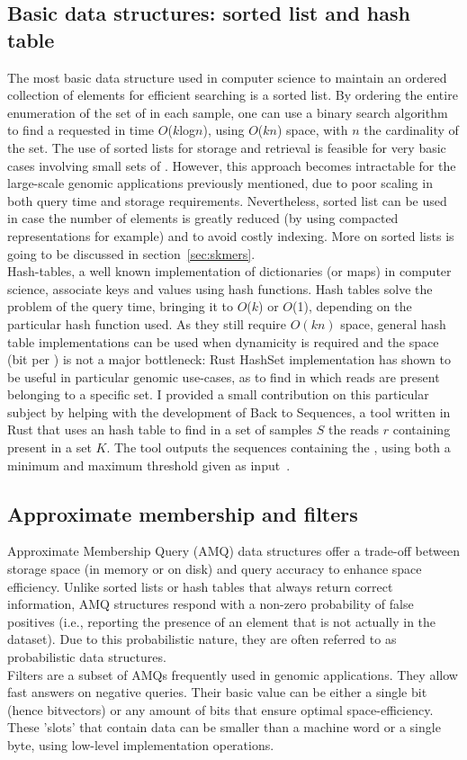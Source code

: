 \subsection{Basic data structures: sorted list and hash table}
The most basic data structure used in computer science to maintain an ordered collection of elements for efficient searching is a sorted list. By ordering the entire enumeration of the set of \kmers in each sample, one can use a binary search algorithm to find a requested \kmer in time $O$($k$log$n$), using $O$($kn$) space, with $n$ the cardinality of the set. The use of sorted lists for \kmer storage and retrieval is feasible for very basic cases involving small sets of \kmers. However, this approach becomes intractable for the large-scale genomic applications previously mentioned, due to poor scaling in both query time and storage requirements. Nevertheless, sorted list can be used in case the number of elements is greatly reduced (by using compacted \kmer representations for example) and to avoid costly indexing. More on sorted lists is going to be discussed in section~\ref{sec:skmers}.\\
Hash-tables, a well known implementation of dictionaries (or maps) in computer science, associate keys and values using hash functions. Hash tables solve the problem of the query time, bringing it to $O$($k$) or $O$(1), depending on the particular hash function used. As they still require $O(kn)$ space, general hash table implementations can be used when dynamicity is required and the space (bit per \kmer) is not a major bottleneck: Rust HashSet implementation has shown to be useful in particular genomic use-cases, as to find in which reads are present \kmers belonging to a specific set. I provided a small contribution on this particular subject by helping with the development of Back to Sequences, a tool written in Rust that uses an hash table to find in a set of samples $S$ the reads $r$ containing \kmers present in a set $K$. The tool outputs the sequences containing the \kmers, using both a minimum and maximum threshold given as input~\cite{back_to_sequences}.\\

\subsection{Approximate membership and filters}
Approximate Membership Query (\gls{AMQ}) data structures offer a trade-off between storage space (in memory or on disk) and query accuracy to enhance space efficiency. Unlike sorted lists or hash tables that always return correct information, AMQ structures respond with a non-zero probability of false positives (i.e., reporting the presence of an element that is not actually in the dataset). Due to this probabilistic nature, they are often referred to as probabilistic data structures.\\
Filters are a subset of AMQs frequently used in genomic applications. They allow fast answers on negative queries. Their basic value can be either a single bit (hence bitvectors) or any amount of bits that ensure optimal space-efficiency. These 'slots' that contain data can be smaller than a machine word or a single byte, using low-level implementation operations.

